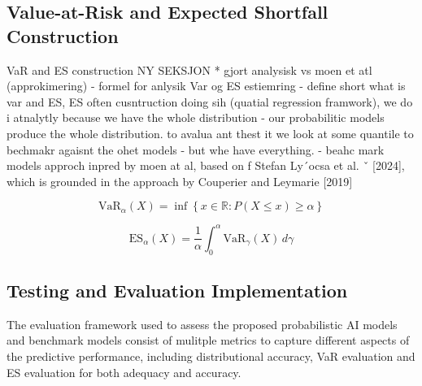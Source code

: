 

\subsection{Value-at-Risk and Expected Shortfall Construction}
VaR and ES construction NY SEKSJON
* gjort analysisk vs moen et atl (approkimering) - formel for anlysik Var og ES estiemring
- define short what is var and ES, ES often cusntruction doing sih (quatial regression framwork), we do i atnalytly because we have the whole distribution
- our probabilitic models produce the whole distribution. to avalua ant thest it we look at some quantile to bechmakr agaisnt the ohet models - but whe have everything. 
- beahc mark models approch inpred by moen at al, based on f Stefan Ly´ocsa et al. ˇ [2024], which is grounded in the approach by Couperier and Leymarie [2019]

\begin{equation}
    \text{VaR}_\alpha(X) = \inf \left\{ x \in \mathbb{R} : P(X \leq x) \geq \alpha \right\}
\end{equation}

\begin{equation}
    \text{ES}_{\alpha}(X) = \frac{1}{\alpha} \int_0^{\alpha} \text{VaR}_{\gamma}(X) \, d\gamma
\end{equation}

\subsection{Testing and Evaluation Implementation}
\label{sec:testing_and_evaluation_implementation}
The evaluation framework used to assess the proposed probabilistic AI models and benchmark models consist of mulitple metrics to capture different aspects of the predictive performance, including distributional accuracy, VaR evaluation and ES evaluation for both adequacy and accuracy. 

